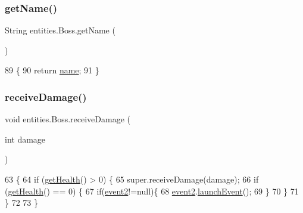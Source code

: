 \subsubsection{\texorpdfstring{get\+Name()}{getName()}}
{\footnotesize\ttfamily String entities.\+Boss.\+get\+Name (\begin{DoxyParamCaption}{ }\end{DoxyParamCaption})\hspace{0.3cm}{\ttfamily [inline]}}


\begin{DoxyCode}
89                             \{
90         \textcolor{keywordflow}{return} \mbox{\hyperlink{classentities_1_1_boss_a859a82dc20d22942934fb9f508b87310}{name}};
91     \}
\end{DoxyCode}
\mbox{\label{classentities_1_1_boss_aec4d14cfccd10ccf26b0dc7548c6ff96}} 
\subsubsection{\texorpdfstring{receive\+Damage()}{receiveDamage()}}
{\footnotesize\ttfamily void entities.\+Boss.\+receive\+Damage (\begin{DoxyParamCaption}\item[{int}]{damage }\end{DoxyParamCaption})\hspace{0.3cm}{\ttfamily [inline]}}


\begin{DoxyCode}
63                                           \{
64         \textcolor{keywordflow}{if} (\mbox{\hyperlink{classentities_1_1_subject_a5876631b4eb906fe9e1b51dd94a849e4}{getHealth}}() > 0) \{
65             super.receiveDamage(damage);
66             \textcolor{keywordflow}{if} (\mbox{\hyperlink{classentities_1_1_subject_a5876631b4eb906fe9e1b51dd94a849e4}{getHealth}}() == 0) \{
67                 \textcolor{keywordflow}{if}(\mbox{\hyperlink{classentities_1_1_boss_a17e07c1e6ee08f6f8a7250ba25828199}{event2}}!=null)\{
68                     \mbox{\hyperlink{classentities_1_1_boss_a17e07c1e6ee08f6f8a7250ba25828199}{event2}}.\mbox{\hyperlink{interfaceentities_1_1_event_launcher_a4aa8692d30404ff21b04dfc688e8efe0}{launchEvent}}();
69                 \}
70             \}
71         \}
72 
73     \}
\end{DoxyCode}
\mbox{\label{classentities_1_1_boss_a0c267eb85abdfcf5b1ab6bd3093dc249}} 
